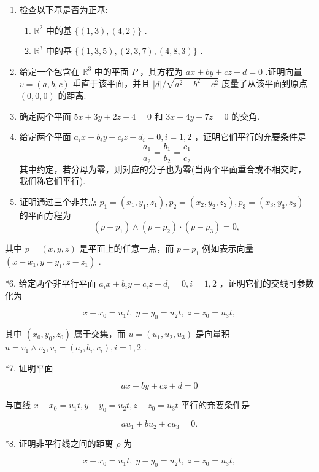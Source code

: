 \exerciseline
\begin{enumerate}
    \item 检查以下基是否为正基:
\begin{enumerate}
    \item[a.] $\mathbb{R}^2$ 中的基 $\{ (1,3) ,(4,2) \}$ .
    \item[b.] $\mathbb{R}^3$ 中的基 $\{ (1,3,5) ,(2,3,7) ,(4,8,3) \}$ .
\end{enumerate}
    \item[*] 给定一个包含在 $\mathbb{R}^3$ 中的平面 $P$ ，其方程为 $ax + by + cz + d = 0$ .证明向量 $v = (a,b,c)$ 垂直于该平面，并且 $|d| /\sqrt{a^2 + b^2 + c^2}$ 度量了从该平面到原点 $(0,0,0)$ 的距离.
    \item[*] 确定两个平面 $5x + 3y +  2z - 4 = 0$ 和 $3x + 4y - 7z = 0$ 的交角.
    \item[*] 给定两个平面 $a_ix + b_iy + c_iz + d_i = 0,i = 1,2$ ，证明它们平行的充要条件是
    \[
    \frac{a_1}{a_2} = \frac{b_1}{b_2} = \frac{c_1}{c_2}
    \]
    其中约定，若分母为零，则对应的分子也为零(当两个平面重合或不相交时，我们称它们平行).
    \item 证明通过三个非共点 $p_1 = (x_1,y_1,z_1) ,p_2 = (x_2,y_2,z_2) ,p_3 = (x_3,y_3,z_3)$ 的平面方程为
    \[
    (p - p_1)  \land  (p - p_2)  \cdot  (p - p_3)  = 0,
    \]
\end{enumerate}

其中 \(p = \left( {x,y,z}\right)\) 是平面上的任意一点，而 \(p - {p}_{1}\) 例如表示向量 \(\left( {x - {x}_{1},y - {y}_{1},z - {z}_{1}}\right)\) .

*6. 给定两个非平行平面 \({a}_{i}x + {b}_{i}y + {c}_{i}z + {d}_{i} = 0,i = 1,2\) ，证明它们的交线可参数化为

\[
x - {x}_{0} = {u}_{1}t,\;y - {y}_{0} = {u}_{2}t,\;z - {z}_{0} = {u}_{3}t,
\]

其中 \(\left( {{x}_{0},{y}_{0},{z}_{0}}\right)\) 属于交集，而 \(u = \left( {{u}_{1},{u}_{2},{u}_{3}}\right)\) 是向量积 \(u = {v}_{1} \land  {v}_{2},{v}_{i} = \left( {{a}_{i},{b}_{i},{c}_{i}}\right) ,i = 1,2\) .

*7. 证明平面

\[
{ax} + {by} + {cz} + d = 0
\]

与直线 \(x - {x}_{0} = {u}_{1}t,y - {y}_{0} = {u}_{2}t,z - {z}_{0} = {u}_{3}t\) 平行的充要条件是

\[
a{u}_{1} + b{u}_{2} + c{u}_{3} = 0.
\]

*8. 证明非平行线之间的距离 \(\rho\) 为

\[
x - {x}_{0} = {u}_{1}t,\;y - {y}_{0} = {u}_{2}t,\;z - {z}_{0} = {u}_{3}t,
\]

